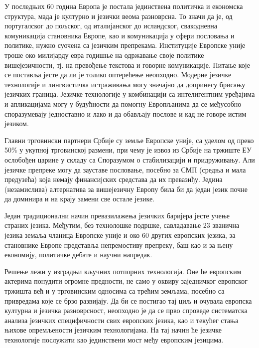 {

  
\begin{multicols}{2}


У последњих 60 година Европа је постала јединствена политичка и економска структура, мада је културно и језички веома разноврсна. То значи да је, од португалског до пољског, од италијанског до исландског, свакодневна комуникација становника Европе, као и комуникација у сфери пословања и политике, нужно суочена са језичким препрекама. Институције Европске уније троше око милијарду евра годишње на одржавање своје политике вишејезичности, тј. на превођење текстова и говорне комуникације. Питање које се поставља јесте да ли је толико оптерећење неопходно. Модерне језичке технологије и лингвистичка истраживања могу значајно да допринесу брисању језичких граница. Језичке технологије у комбинацији са интелигентним уређајима и апликацијама могу у будућности да помогну Европљанима да се међусобно споразумевају једноставно и лако и да обављају  послове и кад не говоре истим  језиком. 


Главни трговински партнери Србије су земље Европске уније, са уделом од преко 50\% у укупној трговинској размени, при чему је извоз из Србије на тржиште ЕУ ослобођен царине у складу са Споразумом о стабилизацији и придруживању. Али језичке препреке могу да зауставе пословање, посебно за СМП (средња и мала предузећа) која немају финансијских средстава да их превазиђу. Једина (незамислива) алтернатива за вишејезичну Европу била би да један језик почне да доминира и на крају замени све остале језике. 

Један традиционални начин превазилажења језичких баријера јесте учење страних језика. Међутим, без технолошке подршке, савладавање 23 званична језика земаља чланица Европске уније и око 60 других европских језика, за становнике Европе представља непремостиву препреку, баш као и за њену економију, политичке дебате и научни напредак. 

Решење лежи у изградњи кључних потпорних технологија. Оне ће европским актерима понудити огромне предности, не само у оквиру заједничког европског тржишта већ и у трговинским односима са трећим земљама, посебно са привредама које се брзо развијају. Да би се постигао тај циљ и очувала европска културна и језичка разноврсност, неопходно је да се прво спроведе систематска анализа језичких специфичности свих европских језика, као и  текућег стања њихове опремљености језичким технологијама. На тај начин ће језичке технологије послужити као јединствени мост међу европским језицима. 


\end{multicols}}
